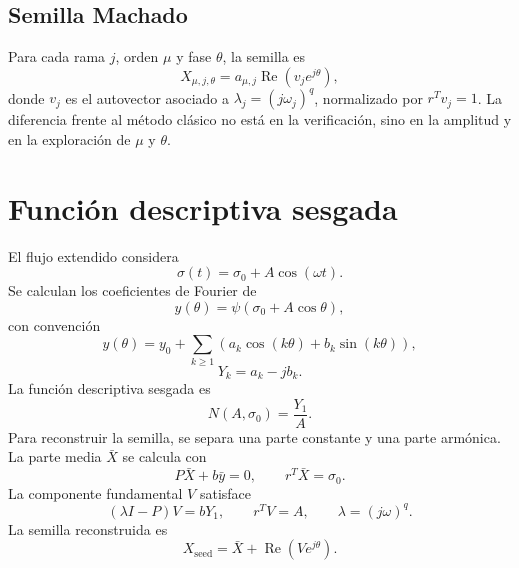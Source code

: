\documentclass[11pt]{article}
\begin{document}
\subsection{Semilla Machado}

Para cada rama \(j\), orden \(\mu\) y fase \(\theta\), la semilla es
\begin{equation}
X_{\mu,j,\theta}=a_{\mu,j}\operatorname{Re}\left(v_j e^{j\theta}\right),
\label{eq:seed_machado}
\end{equation}
donde \(v_j\) es el autovector asociado a \(\lambda_j=(j\omega_j)^q\), normalizado por \(r^Tv_j=1\). La diferencia frente al método clásico no está en la verificación, sino en la amplitud y en la exploración de \(\mu\) y \(\theta\).

\section{Función descriptiva sesgada}

El flujo extendido considera
\begin{equation}
\sigma(t)=\sigma_0+A\cos(\omega t).
\end{equation}
Se calculan los coeficientes de Fourier de
\begin{equation}
y(\theta)=\psi(\sigma_0+A\cos\theta),
\end{equation}
con convención
\begin{equation}
y(\theta)=y_0+\sum_{k\geq 1}\left(a_k\cos(k\theta)+b_k\sin(k\theta)\right),
\end{equation}
\begin{equation}
Y_k=a_k-jb_k.
\end{equation}
La función descriptiva sesgada es
\begin{equation}
N(A,\sigma_0)=\frac{Y_1}{A}.
\label{eq:N_biased}
\end{equation}
Para reconstruir la semilla, se separa una parte constante y una parte armónica. La parte media \(\bar X\) se calcula con
\begin{equation}
P\bar X+b\bar y=0,
\qquad
r^T\bar X=\sigma_0.
\label{eq:dc_biased}
\end{equation}
La componente fundamental \(V\) satisface
\begin{equation}
(\lambda I-P)V=bY_1,
\qquad
r^TV=A,
\qquad
\lambda=(j\omega)^q.
\label{eq:harm_biased}
\end{equation}
La semilla reconstruida es
\begin{equation}
X_{\mathrm{seed}}=\bar X+\operatorname{Re}(Ve^{j\theta}).
\label{eq:seed_biased}
\end{equation}
\end{document}
